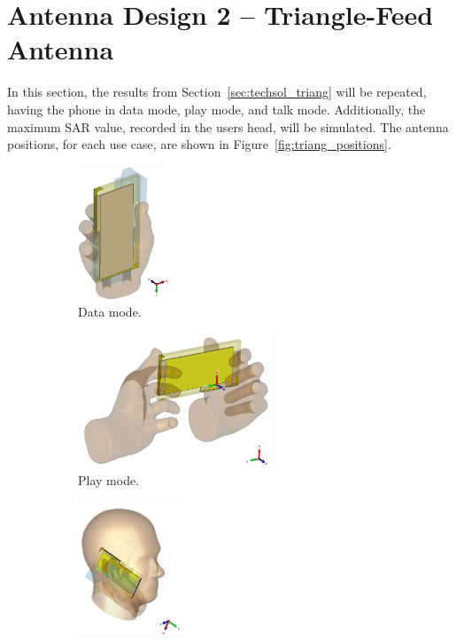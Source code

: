 \section{Antenna Design 2 -- Triangle-Feed Antenna}
In this section, the results from Section~\ref{sec:techsol_triang} will be repeated, having the phone in data mode, play mode, and talk mode. Additionally, the maximum SAR value, recorded in the users head, will be simulated. The antenna positions, for each use case, are shown in Figure~\ref{fig:triang_positions}.

\begin{figure}[htbp]
    \centering
    \begin{subfigure}[b]{0.24\linewidth}
        \centering
        \includegraphics[width=\linewidth,height=4cm,keepaspectratio]{img/tech_sol/trianglefeed/data_mode/3d.PNG}
        \caption{Data mode.}
    \end{subfigure}
    \begin{subfigure}[b]{0.24\linewidth}
        \centering
        \includegraphics[width=\linewidth,height=4cm,keepaspectratio]{img/tech_sol/trianglefeed/play_mode/3d.PNG}
        \caption{Play mode.}
    \end{subfigure}
    \begin{subfigure}[b]{0.24\linewidth}
        \centering
        \includegraphics[width=\linewidth,height=4cm,keepaspectratio]{img/tech_sol/trianglefeed/talk_mode/3d.PNG}

\end{subfigure}
\end{figure}
